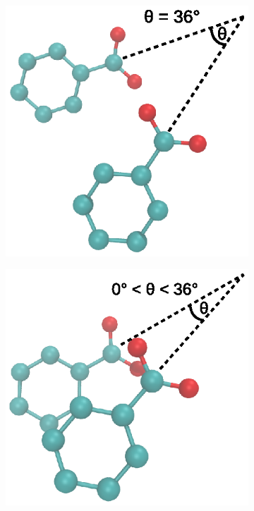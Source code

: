 \documentclass{article}
\begin{document}
  \begin{figure}[!htb]
  \centering
  \begin{subfigure}{0.45\textwidth}
  \centering
  \includegraphics[width=\textwidth]{pd_36.eps}
  \caption{}\label{fig:pd_36}
  \end{subfigure}
  \begin{subfigure}{0.45\textwidth}
  \centering
  \includegraphics[width=\textwidth]{pd_lt36.eps}

\end{subfigure}
\end{figure}
\end{document}
